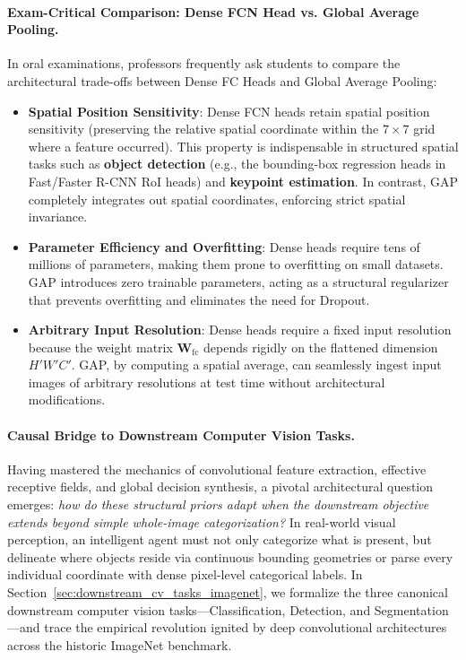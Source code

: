 \paragraph{Exam-Critical Comparison: Dense FCN Head vs. Global Average Pooling.}
In oral examinations, professors frequently ask students to compare the architectural trade-offs between Dense FC Heads and Global Average Pooling:
\begin{itemize}[leftmargin=*]
  \item \textbf{Spatial Position Sensitivity}: Dense FCN heads retain spatial position sensitivity (preserving the relative spatial coordinate within the $7 \times 7$ grid where a feature occurred). This property is indispensable in structured spatial tasks such as \textbf{object detection} (e.g., the bounding-box regression heads in Fast/Faster R-CNN RoI heads) and \textbf{keypoint estimation}. In contrast, GAP completely integrates out spatial coordinates, enforcing strict spatial invariance.
  \item \textbf{Parameter Efficiency and Overfitting}: Dense heads require tens of millions of parameters, making them prone to overfitting on small datasets. GAP introduces zero trainable parameters, acting as a structural regularizer that prevents overfitting and eliminates the need for Dropout.
  \item \textbf{Arbitrary Input Resolution}: Dense heads require a fixed input resolution because the weight matrix $\mathbf{W}_{\text{fc}}$ depends rigidly on the flattened dimension $H' W' C'$. GAP, by computing a spatial average, can seamlessly ingest input images of arbitrary resolutions at test time without architectural modifications.
\end{itemize}

\paragraph{Causal Bridge to Downstream Computer Vision Tasks.}
Having mastered the mechanics of convolutional feature extraction, effective receptive fields, and global decision synthesis, a pivotal architectural question emerges: \textit{how do these structural priors adapt when the downstream objective extends beyond simple whole-image categorization?} In real-world visual perception, an intelligent agent must not only categorize what is present, but delineate where objects reside via continuous bounding geometries or parse every individual coordinate with dense pixel-level categorical labels. In Section~\ref{sec:downstream_cv_tasks_imagenet}, we formalize the three canonical downstream computer vision tasks---Classification, Detection, and Segmentation---and trace the empirical revolution ignited by deep convolutional architectures across the historic ImageNet benchmark.


